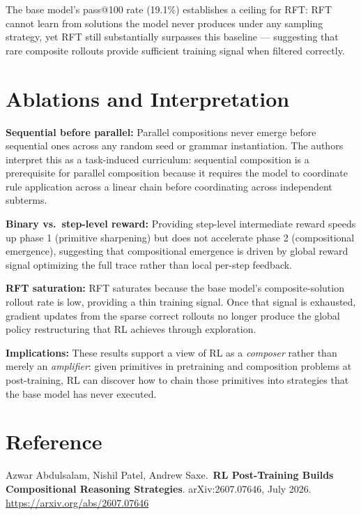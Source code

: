 \documentclass[10pt,twocolumn]{article}
\begin{document}
The base model's pass@100 rate (19.1\%) establishes a ceiling for
RFT: RFT cannot learn from solutions the model never produces under
any sampling strategy, yet RFT still substantially surpasses this
baseline --- suggesting that rare composite rollouts provide
sufficient training signal when filtered correctly.

\section{Ablations and Interpretation}

\textbf{Sequential before parallel:} Parallel compositions never
emerge before sequential ones across any random seed or grammar
instantiation.
The authors interpret this as a task-induced curriculum:
sequential composition is a prerequisite for parallel composition
because it requires the model to coordinate rule application across
a linear chain before coordinating across independent subterms.

\textbf{Binary vs.\ step-level reward:} Providing step-level
intermediate reward speeds up phase 1 (primitive sharpening)
but does not accelerate phase 2 (compositional emergence),
suggesting that compositional emergence is driven by global
reward signal optimizing the full trace rather than local
per-step feedback.

\textbf{RFT saturation:} RFT saturates because the base model's
composite-solution rollout rate is low, providing a thin training
signal.
Once that signal is exhausted, gradient updates from the sparse
correct rollouts no longer produce the global policy restructuring
that RL achieves through exploration.

\textbf{Implications:} These results support a view of RL as a
\emph{composer} rather than merely an \emph{amplifier}: given
primitives in pretraining and composition problems at post-training,
RL can discover how to chain those primitives into strategies
that the base model has never executed.

\section*{Reference}

Azwar Abdulsalam, Nishil Patel, Andrew Saxe.\
\textbf{RL Post-Training Builds Compositional Reasoning Strategies}.
arXiv:2607.07646, July 2026.
\url{https://arxiv.org/abs/2607.07646}
\end{document}
